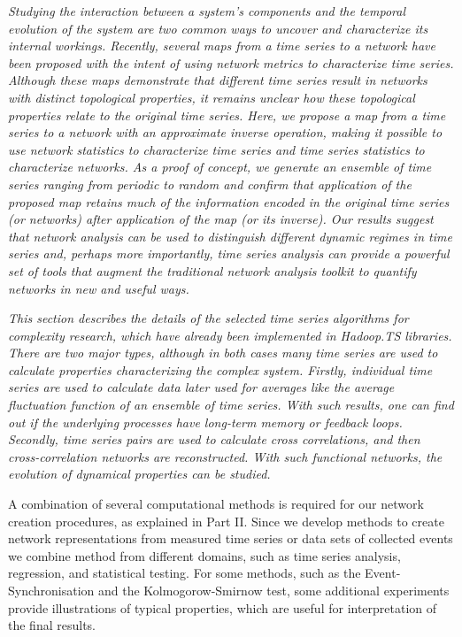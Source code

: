 \documentclass[a4paper,10pt]{scrbook}
\begin{document}
\textit{Studying the interaction between a system's components and the temporal evolution of the system are two common ways to uncover and characterize its internal workings. Recently, several maps from a time series to a network have been proposed with the intent of using network metrics to characterize time series. Although these maps demonstrate that different time series result in networks with distinct topological properties, it remains unclear how these topological properties relate to the original time series. Here, we propose a map from a time series to a network with an approximate inverse operation, making it possible to use network statistics to characterize time series and time series statistics to characterize networks. As a proof of concept, we generate an ensemble of time series ranging from periodic to random and confirm that application of the proposed map retains much of the information encoded in the original time series (or networks) after application of the map (or its inverse). Our results suggest that network analysis can be used to distinguish different dynamic regimes in time series and, perhaps more importantly, time series analysis can provide a powerful set of tools that augment the traditional network analysis toolkit to quantify networks in new and useful ways.}



\textit{This section describes the details of the selected time series algorithms for complexity research, which have already been implemented in 
Hadoop.TS libraries. There are two major types, although in both cases many time series are used to calculate 
properties characterizing the complex system.  Firstly, individual time series are used to calculate 
data later used for averages like the average fluctuation function of an ensemble of 
time series.  With such results, one can find out if the underlying processes have long-term memory or feedback 
loops.  Secondly, time series pairs are used to calculate cross
correlations, and then cross-correlation networks are reconstructed.  With such functional networks, the evolution 
of dynamical properties can be studied. 
}

A combination of several computational methods is required for our network creation procedures, as explained in Part II. Since we develop methods to create network representations from measured time series or data sets of collected events we combine method from different domains, such as time series analysis, regression, and statistical testing. For some methods, such as the Event-Synchronisation and the Kolmogorow-Smirnow test, some additional experiments provide illustrations of typical properties, which are useful for interpretation of the final results. 
\end{document}
